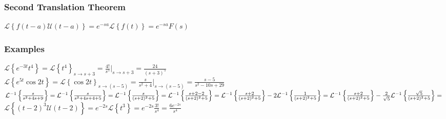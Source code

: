 \documentclass{article}
\begin{document}
\subsubsection{Second Translation Theorem}
$\mathcal{L}\left\{f(t-a)\mathcal{U}(t-a)\right\}=e^{-sa}\mathcal{L}\left\{f(t)\right\}=e^{-sa}F(s)$
\subsubsection{Examples}
$\mathcal{L}\left\{e^{-3t}t^4\right\} = \mathcal{L}\left\{t^4\right\}_{s\to s+3} = \frac{4!}{s^5}|_{s \to s+3} = \frac{24}{(s+3)^5}$
\\$\mathcal{L}\left\{e^{5t}\cos 2t\right\} = \mathcal{L}\left\{\cos 2t \right\}_{s \to (s-5)} = \frac{s}{s^2+4}\vert_{s \to (s-5)} = \frac{s-5}{s^2-10s+29}$
\\$\mathcal{L}^{-1}\left\{\frac{s}{s^2+4s+9}\right\}=\mathcal{L}^{-1}\left\{\frac{s}{s^2+4s+4+5}\right\}=\mathcal{L}^{-1}\left\{\frac{s}{(s+2)^2+5}\right\} = \mathcal{L}^{-1}\left\{\frac{s+2-2}{(s+2)^2+5}\right\} =\\ \mathcal{L}^{-1}\left\{\frac{s+2}{(s+2)^2+5}\right\} -2\mathcal{L}^{-1}\left\{\frac{1}{(s+2)^2+5}\right\}= \mathcal{L}^{-1}\left\{\frac{s+2}{(s+2)^2+5}\right\} -\frac{2}{\sqrt{5}}\mathcal{L}^{-1}\left\{\frac{\sqrt{5}}{(s+2)^2+5}\right\}=\\$ 
\\$\mathcal{L}\left\{(t-2)^3\mathcal{U}(t-2)\right\}=e^{-2s}\mathcal{L}\left\{t^3\right\}=e^{-2s}\frac{3!}{s^4}=\frac{6e^{-2s}}{s^4}$
\end{document}
